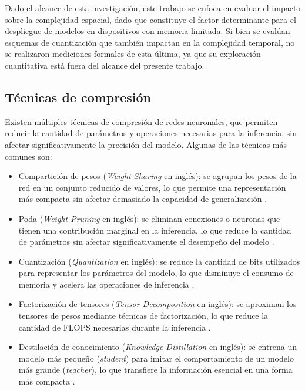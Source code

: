 Dado el alcance de esta investigación, este trabajo se enfoca en evaluar el impacto sobre la complejidad espacial, dado que constituye el factor determinante para el despliegue de modelos en dispositivos con memoria limitada. Si bien se evalúan esquemas de cuantización que también impactan en la complejidad temporal, no se realizaron mediciones formales de esta última, ya que su exploración cuantitativa está fuera del alcance del presente trabajo.

\subsection{Técnicas de compresión}
Existen múltiples técnicas de compresión de redes neuronales, que permiten reducir la cantidad de parámetros y operaciones necesarias para la inferencia, sin afectar significativamente la precisión del modelo. Algunas de las técnicas más comunes son:

\begin{itemize}
    \item Compartición de pesos (\textit{Weight Sharing} en inglés): se agrupan los pesos de la red en un conjunto reducido de valores, lo que permite una representación más compacta sin afectar demasiado la capacidad de generalización \cite{8253600}.
    \item Poda (\textit{Weight Pruning} en inglés): se eliminan conexiones o neuronas que tienen una contribución marginal en la inferencia, lo que reduce la cantidad de parámetros sin afectar significativamente el desempeño del modelo \cite{8253600}.
    \item Cuantización (\textit{Quantization} en inglés): se reduce la cantidad de bits utilizados para representar los parámetros del modelo, lo que disminuye el consumo de memoria y acelera las operaciones de inferencia \cite{8253600}.
    \item Factorización de tensores (\textit{Tensor Decomposition} en inglés): se aproximan los tensores de pesos mediante técnicas de factorización, lo que reduce la cantidad de FLOPS necesarias durante la inferencia \cite{8253600}.
    \item Destilación de conocimiento (\textit{Knowledge Distillation} en inglés): se entrena un modelo más pequeño (\textit{student}) para imitar el comportamiento de un modelo más grande (\textit{teacher}), lo que transfiere la información esencial en una forma más compacta \cite{8253600}.
\end{itemize}

